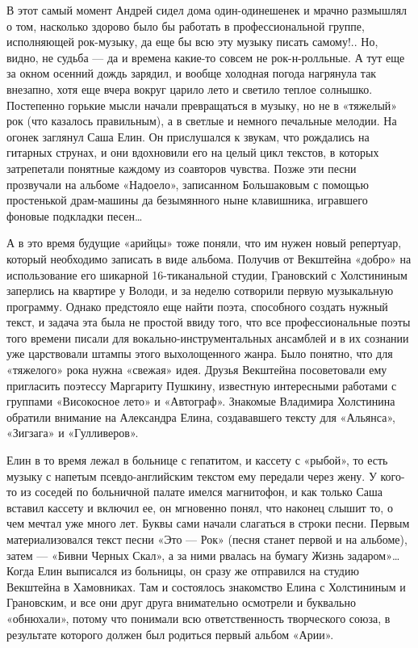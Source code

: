 \documentclass[10pt, twoside]{book}
\begin{document}
В этот самый момент Андрей сидел дома один-одинешенек и мрачно размышлял о том, насколько здорово было бы работать в
профессиональной группе, исполняющей рок-музыку, да еще бы всю эту музыку писать самому!.. Но, видно, не судьба — да и
времена какие-то совсем не рок-н-ролльные. А тут еще за окном осенний дождь зарядил, и вообще холодная погода нагрянула
так внезапно, хотя еще вчера вокруг царило лето и светило теплое солнышко. Постепенно горькие мысли начали превращаться
в музыку, но не в «тяжелый» рок (что казалось правильным), а в светлые и немного печальные мелодии. На огонек заглянул
Саша Елин. Он прислушался к звукам, что рождались на гитарных струнах, и они вдохновили его на целый цикл текстов, в
которых затрепетали понятные каждому из соавторов чувства. Позже эти песни прозвучали на альбоме «Надоело», записанном
Большаковым с помощью простенькой драм-машины да безымянного ныне клавишника, игравшего фоновые подкладки песен\ldots

А в это время будущие «арийцы» тоже поняли, что им нужен новый репертуар, который необходимо записать в виде альбома.
Получив от Векштейна «добро» на использование его шикарной 16-тиканальной студии, Грановский с Холстининым заперлись на
квартире у Володи, и за неделю сотворили первую музыкальную программу. Однако предстояло еще найти поэта, способного
создать нужный текст, и задача эта была не простой ввиду того, что все профессиональные поэты того времени писали для
вокально-инструментальных ансамблей и в их сознании уже царствовали штампы этого выхолощенного жанра. Было понятно, что
для «тяжелого» рока нужна «свежая» идея. Друзья Векштейна посоветовали ему пригласить поэтессу Маргариту Пушкину,
известную интересными работами с группами «Високосное лето» и «Автограф». Знакомые Владимира Холстинина обратили
внимание на Александра Елина, создававшего тексту для «Альянса», «Зигзага» и «Гулливеров».

Елин в то время лежал в больнице с гепатитом, и кассету с «рыбой», то есть музыку с напетым псевдо-английским текстом
ему передали через жену. У кого-то из соседей по больничной палате имелся магнитофон, и как только Саша вставил кассету
и включил ее, он мгновенно понял, что наконец слышит то, о чем мечтал уже много лет. Буквы сами начали слагаться в
строки песни. Первым материализовался текст песни «Это — Рок» (песня станет первой и на альбоме), затем — «Бивни Черных
Скал», а за ними рвалась на бумагу Жизнь задаром»\ldots Когда Елин выписался из больницы, он сразу же отправился на
студию Векштейна в Хамовниках. Там и состоялось знакомство Елина с Холстининым и Грановским, и все они друг друга
внимательно осмотрели и буквально «обнюхали», потому что понимали всю ответственность творческого союза, в результате
которого должен был родиться первый альбом «Арии».
\end{document}
